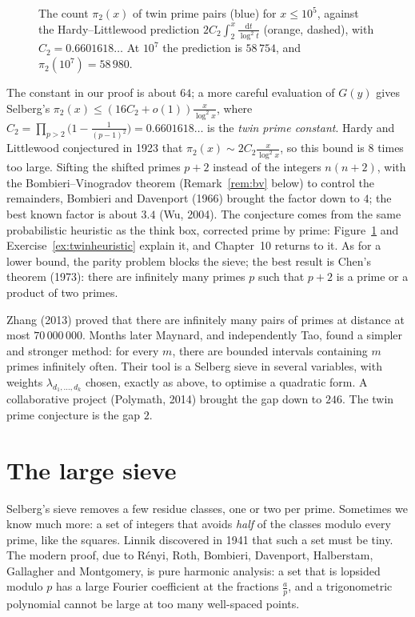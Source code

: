 \begin{figure}[ht]
\centering
{}
\caption{The count $\pi_2(x)$ of twin prime pairs (blue) for $x\le10^5$, against the Hardy--Littlewood prediction $2C_2\int_2^x\frac{\mathrm dt}{\log^2t}$ (orange, dashed), with $C_2=0.6601618\ldots$ At $10^7$ the
prediction is $58\,754$, and $\pi_2(10^7)=58\,980$.}
\label{fig:twins}
\end{figure}

\begin{remark}
The constant in our proof is about $64$; a more careful evaluation of $G(y)$ gives Selberg's $\pi_2(x)\le(16C_2+o(1))\frac x{\log^2x}$, where $C_2=\prod_{p>2}\bigl(1-\frac1{(p-1)^2}\bigr)=0.6601618\ldots$ is the \emph{twin prime constant}.
Hardy and Littlewood conjectured in 1923 that $\pi_2(x)\sim2C_2\frac x{\log^2x}$, so this bound is $8$ times too large. Sifting the shifted primes $p+2$ instead of the integers $n(n+2)$, with the Bombieri--Vinogradov theorem (Remark~\ref{rem:bv} below) to control the remainders, Bombieri and Davenport (1966) brought the factor down to $4$; the best known factor is about $3.4$ (Wu, 2004). The conjecture comes from the same
probabilistic heuristic as the think box, corrected prime by prime: Figure~\ref{fig:twins} and Exercise~\ref{ex:twinheuristic} explain it, and Chapter~10 returns to it. As for a lower bound,
the parity problem blocks the sieve; the best result is Chen's theorem (1973): there are infinitely many primes $p$ such that $p+2$ is a prime or a product of two primes.
\end{remark}

\begin{beauty}
Zhang (2013) proved that there are infinitely many pairs of primes at distance at most $70\,000\,000$. Months later Maynard, and independently Tao, found a simpler and stronger method:
for every $m$, there are bounded intervals containing $m$ primes infinitely often. Their tool is a Selberg sieve in several variables, with weights $\lambda_{d_1,\dots,d_k}$ chosen,
exactly as above, to optimise a quadratic form. A collaborative project (Polymath, 2014) brought the gap down to $246$. The twin prime conjecture is the gap $2$.
\end{beauty}

\section{The large sieve}

Selberg's sieve removes a few residue classes, one or two per prime. Sometimes we know much more: a set of integers that avoids \emph{half} of the classes modulo every prime, like
the squares. Linnik discovered in 1941 that such a set must be tiny. The modern proof, due to Rényi, Roth, Bombieri, Davenport, Halberstam, Gallagher and Montgomery, is pure harmonic analysis:
a set that is lopsided modulo $p$ has a large Fourier coefficient at the fractions $\frac ap$, and a trigonometric polynomial cannot be large at too many well-spaced points.

